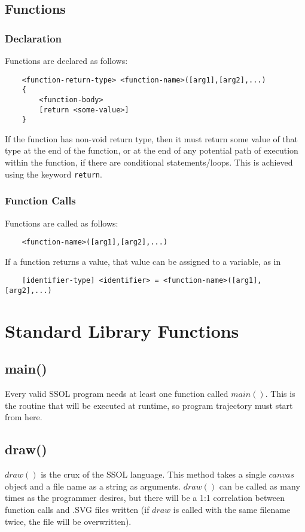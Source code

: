 \documentclass{article}
\begin{document}
\subsection{Functions}
\subsubsection{Declaration}
Functions are declared as follows:
\begin{verbatim}
    <function-return-type> <function-name>([arg1],[arg2],...)
    {
        <function-body>
        [return <some-value>]
    }
\end{verbatim}
If the function has non-void return type, then it must return some value of that type at the end of the function, or
at the end of any potential path of execution within the function, if there are conditional statements/loops. This is achieved using the keyword \texttt{return}.

\subsubsection{Function Calls}
Functions are called as follows:
\begin{verbatim}
    <function-name>([arg1],[arg2],...)
\end{verbatim}

If a function returns a value, that value can be assigned to a variable, as in
\begin{verbatim}
    [identifier-type] <identifier> = <function-name>([arg1],[arg2],...)
\end{verbatim}

\section{Standard Library Functions}
\subsection{main()}
Every valid SSOL program needs at least one function called $main()$. This is the routine that will be executed at runtime, so program trajectory must start from here.
\subsection{draw()}
$draw()$ is the crux of the SSOL language. This method takes a single $canvas$ object and a file name as a string as arguments. $draw()$ can be called as many times as the programmer desires, but there will be a 1:1 correlation between function calls and .SVG files written (if $draw$ is called with the same filename twice, the file will be overwritten).
\end{document}
